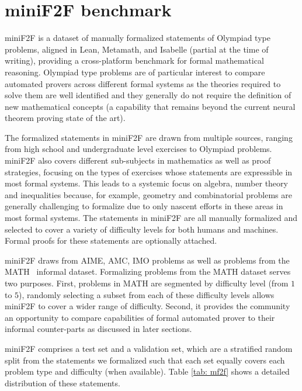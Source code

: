 \section{miniF2F benchmark}

\textsf{miniF2F} is a dataset of manually formalized statements of Olympiad type problems, aligned in Lean, Metamath, and Isabelle (partial at the time of writing), providing a cross-platform benchmark for formal mathematical reasoning. Olympiad type problems are of particular interest to compare automated provers across different formal systems as the theories required to solve them are well identified and they generally do not require the definition of new mathematical concepts (a capability that remains beyond the current neural theorem proving state of the art).

The formalized statements in \textsf{miniF2F} are drawn from multiple sources, ranging from high school and undergraduate level exercises to Olympiad problems. \textsf{miniF2F} also covers different sub-subjects in mathematics as well as proof strategies, focusing on the types of exercises whose statements are expressible in most formal systems. This leads to a systemic focus on algebra, number theory and inequalities because, for example, geometry and combinatorial problems are generally challenging to formalize due to only nascent efforts in these areas in most formal systems. The statements in \textsf{miniF2F} are all manually formalized and selected to cover a variety of difficulty levels for both humans and machines. Formal proofs for these statements are optionally attached.

\textsf{miniF2F} draws from AIME, AMC, IMO problems as well as problems from the MATH~\citep{hendrycks2021measuring} informal dataset. Formalizing problems from the MATH dataset serves two purposes. First, problems in MATH are segmented by difficulty level (from $1$ to $5$), randomly selecting a subset from each of these difficulty levels allows \textsf{miniF2F} to cover a wider range of difficulty. Second, it provides the community an opportunity to compare capabilities of formal automated prover to their informal counter-parts as discussed in later sections.

\textsf{miniF2F} comprises a test set and a validation set, which are a stratified random split from the statements we formalized such that each set equally covers each problem type and difficulty (when available). Table \ref{tab: mf2f} shows a detailed distribution of these statements.

